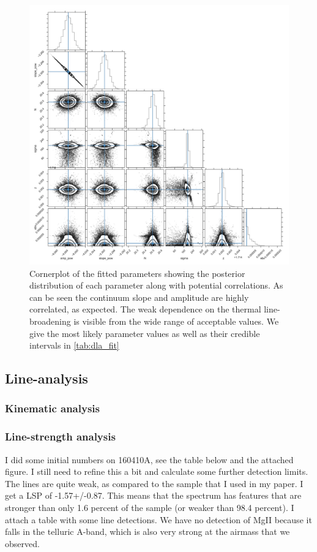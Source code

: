 \documentclass[a4paper,fleqn,usenatbib]{mnras}
\begin{document}
\begin{figure} %
	\includegraphics[width=\columnwidth]{figures/Cornerplot.pdf}
	\caption{Cornerplot of the fitted parameters showing the posterior distribution
		of each parameter along with potential correlations. As can be seen the
		continuum slope and amplitude are highly correlated, as expected. The weak
		dependence on the thermal line-broadening is visible from the wide range of
		acceptable values. We give the most likely parameter values as well as their
		credible intervals in \ref{tab:dla_fit} \label{fig:example_figure}}
\end{figure}


\subsection{Line-analysis}


\subsubsection{Kinematic analysis}

\subsubsection{Line-strength analysis}
I did some initial numbers on 160410A, see the table below and the attached
figure. I still need to refine this a bit and calculate some further detection
limits. The lines are quite weak, as compared to the sample that I used in my
paper. I get a LSP of -1.57+/-0.87. This means that the spectrum has features
that are stronger than only 1.6 percent of the sample (or weaker than 98.4
percent). I attach a table with some line detections. We have no detection of
MgII because it falls in the telluric A-band, which is also very strong at the
airmass that we observed.
\end{document}
